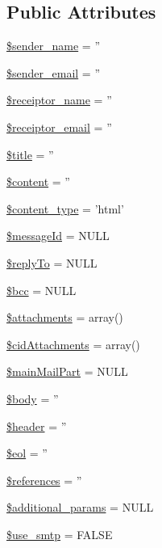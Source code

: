 \subsection*{Public Attributes}
\begin{DoxyCompactItemize}
\item 
\hyperlink{classMail_a0ad6aa18dc8ea8c632bb7a82175e8d68}{\$sender\+\_\+name} = ''
\item 
\hyperlink{classMail_a94dccbbdc161e818d90e41ad197ebe85}{\$sender\+\_\+email} = ''
\item 
\hyperlink{classMail_a44df4937f3c8b2691e9bbb1220c667f3}{\$receiptor\+\_\+name} = ''
\item 
\hyperlink{classMail_aa034785886f8bdcf3a5ed9c86ce8ed14}{\$receiptor\+\_\+email} = ''
\item 
\hyperlink{classMail_aea1a8697c961d49a688564c5ca16cbcb}{\$title} = ''
\item 
\hyperlink{classMail_a5a3320973718a2ca8a3fe798bf79c624}{\$content} = ''
\item 
\hyperlink{classMail_ac933733b17efbb4978a46e557d32c440}{\$content\+\_\+type} = 'html'
\item 
\hyperlink{classMail_a48caf58883e736f50ab87a03147c584a}{\$message\+Id} = N\+U\+L\+L
\item 
\hyperlink{classMail_a55788852017ccc1716af69cdde26df99}{\$reply\+To} = N\+U\+L\+L
\item 
\hyperlink{classMail_a2e25b3c43459422d40765d581b165692}{\$bcc} = N\+U\+L\+L
\item 
\hyperlink{classMail_a93b05b1003cc8ea16b59c00d77f47466}{\$attachments} = array()
\item 
\hyperlink{classMail_a66c6752b550e4e8fd79a63b62815f48f}{\$cid\+Attachments} = array()
\item 
\hyperlink{classMail_ad58544ae1c34119ec852e3c22b855624}{\$main\+Mail\+Part} = N\+U\+L\+L
\item 
\hyperlink{classMail_acbd542849121b33a76ed63e1c4670e02}{\$body} = ''
\item 
\hyperlink{classMail_ace98431d0944d23544743094b443d506}{\$header} = ''
\item 
\hyperlink{classMail_acaebf19cba0b8be83989e241c96f9eb7}{\$eol} = ''
\item 
\hyperlink{classMail_abcd438320caac44b166df90ba9092fe9}{\$references} = ''
\item 
\hyperlink{classMail_a38466de017089677f088c9a4025f724f}{\$additional\+\_\+params} = N\+U\+L\+L
\item 
\hyperlink{classMail_a8fe39b2063dc112d7db67be074142628}{\$use\+\_\+smtp} = F\+A\+L\+S\+E
\end{DoxyCompactItemize}


